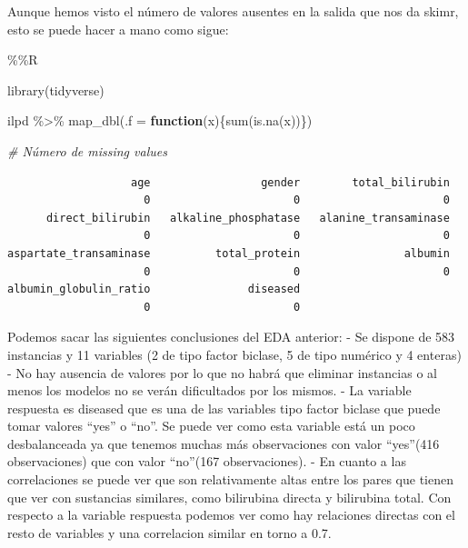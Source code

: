 \documentclass[
  11pt,
  a4paper,
]{article}
\newenvironment{Shaded}{\begin{snugshade}}{\end{snugshade}}
\newcommand{\AttributeTok}[1]{\textcolor[rgb]{0.77,0.63,0.00}{#1}}
\newcommand{\CommentTok}[1]{\textcolor[rgb]{0.56,0.35,0.01}{\textit{#1}}}
\newcommand{\ControlFlowTok}[1]{\textcolor[rgb]{0.13,0.29,0.53}{\textbf{#1}}}
\newcommand{\FunctionTok}[1]{\textcolor[rgb]{0.00,0.00,0.00}{#1}}
\newcommand{\NormalTok}[1]{#1}
\newcommand{\SpecialCharTok}[1]{\textcolor[rgb]{0.00,0.00,0.00}{#1}}
\begin{document}
\newpage

Aunque hemos visto el número de valores ausentes en la salida que nos da
skimr, esto se puede hacer a mano como sigue:

\begin{Shaded}
\begin{Highlighting}[]
\SpecialCharTok{\%\%}\NormalTok{R }

\FunctionTok{library}\NormalTok{(tidyverse)}

\NormalTok{ilpd }\SpecialCharTok{\%\textgreater{}\%} \FunctionTok{map\_dbl}\NormalTok{(}\AttributeTok{.f =} \ControlFlowTok{function}\NormalTok{(x)\{}\FunctionTok{sum}\NormalTok{(}\FunctionTok{is.na}\NormalTok{(x))\}) }

\CommentTok{\# Número de missing values}
\end{Highlighting}
\end{Shaded}

\begin{verbatim}
                   age                 gender        total_bilirubin 
                     0                      0                      0 
      direct_bilirubin   alkaline_phosphatase   alanine_transaminase 
                     0                      0                      0 
aspartate_transaminase          total_protein                albumin 
                     0                      0                      0 
albumin_globulin_ratio               diseased 
                     0                      0 
\end{verbatim}

Podemos sacar las siguientes conclusiones del EDA anterior: - Se dispone
de 583 instancias y 11 variables (2 de tipo factor biclase, 5 de tipo
numérico y 4 enteras) - No hay ausencia de valores por lo que no habrá
que eliminar instancias o al menos los modelos no se verán dificultados
por los mismos. - La variable respuesta es diseased que es una de las
variables tipo factor biclase que puede tomar valores ``yes'' o ``no''.
Se puede ver como esta variable está un poco desbalanceada ya que
tenemos muchas más observaciones con valor ``yes''(416 observaciones)
que con valor ``no''(167 observaciones). - En cuanto a las correlaciones
se puede ver que son relativamente altas entre los pares que tienen que
ver con sustancias similares, como bilirubina directa y bilirubina
total. Con respecto a la variable respuesta podemos ver como hay
relaciones directas con el resto de variables y una correlacion similar
en torno a 0.7.

\newpage
\end{document}
